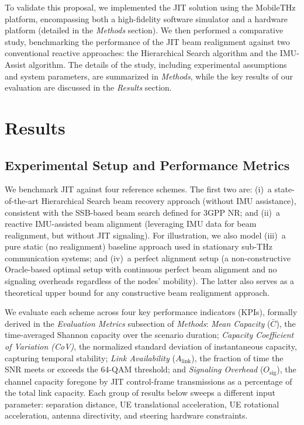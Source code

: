 \documentclass[fleqn,10pt]{wlscirep}
\newcommand{\rev}[1]{{\color{revblue}#1}}
\begin{document}
To validate this proposal, we implemented the JIT solution using the MobileTHz platform, encompassing both a high-fidelity software simulator and a hardware platform (detailed in the \textit{Methods} section). We then performed a comparative study, benchmarking the performance of the JIT beam realignment against two conventional reactive approaches: the Hierarchical Search algorithm and the IMU-Assist algorithm. The details of the study, including experimental assumptions and system parameters, are summarized in \textit{Methods}, while the key results of our evaluation are discussed in the \textit{Results} section.



\section*{Results}

\rev{\subsection*{Experimental Setup and Performance Metrics}}

We benchmark JIT against four reference schemes. The first two are: (i)~a \rev{state-of-the-art Hierarchical Search beam recovery approach (without IMU assistance)\cite{photonics11060540}, consistent with the SSB-based beam search defined for 3GPP NR\cite{Giordani2018ATO, Heng2021SixChallenges}}; and (ii)~a reactive IMU-assisted beam alignment (leveraging IMU data for beam realignment, but without JIT signaling)\rev{\cite{s141019622, Brambilla_2019, 9391649}}. For illustration, we also model (iii)~a pure static (no realignment) baseline approach used in stationary sub-THz communication systems; and (iv)~a perfect alignment setup (a non-constructive Oracle-based optimal setup with continuous perfect beam alignment and no signaling overheads regardless of the nodes' mobility). The latter also serves as a theoretical upper bound for any constructive beam realignment approach.

\rev{We evaluate each scheme across four key performance indicators (KPIs), formally derived in the \textit{Evaluation Metrics} subsection of \textit{Methods}: \emph{Mean Capacity} ($\bar{C}$), the time-averaged Shannon capacity over the scenario duration; \emph{Capacity Coefficient of Variation (CoV)}, the normalized standard deviation of instantaneous capacity, capturing temporal stability; \emph{Link Availability} ($A_{\text{link}}$), the fraction of time the SNR meets or exceeds the 64-QAM threshold; and \emph{Signaling Overhead} ($O_{\text{sig}}$), the channel capacity foregone by JIT control-frame transmissions as a percentage of the total link capacity. Each group of results below sweeps a different input parameter: separation distance, UE translational acceleration, UE rotational acceleration, antenna directivity, and steering hardware constraints.}
\end{document}
